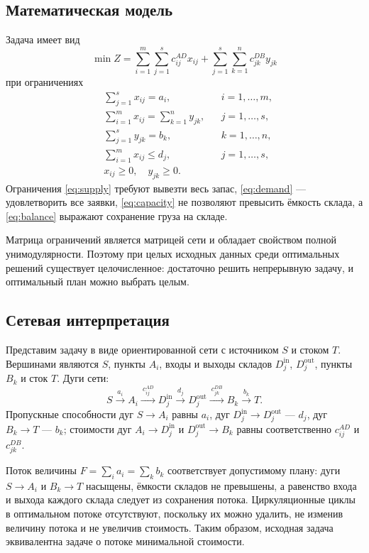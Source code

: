 \subsection*{Математическая модель}

Задача имеет вид
\[
\min Z=\sum_{i=1}^{m}\sum_{j=1}^{s} c^{AD}_{ij}x_{ij}
      +\sum_{j=1}^{s}\sum_{k=1}^{n} c^{DB}_{jk}y_{jk}
\]
при ограничениях
\begin{align}
&\sum_{j=1}^{s} x_{ij}=a_i, && i=1,\ldots,m, \label{eq:supply}\\
&\sum_{i=1}^{m} x_{ij}=\sum_{k=1}^{n} y_{jk}, && j=1,\ldots,s, \label{eq:balance}\\
&\sum_{j=1}^{s} y_{jk}=b_k, && k=1,\ldots,n, \label{eq:demand}\\
&\sum_{i=1}^{m} x_{ij}\le d_j, && j=1,\ldots,s, \label{eq:capacity}\\
&x_{ij}\ge 0,\quad y_{jk}\ge 0. \label{eq:nonneg}
\end{align}
Ограничения \eqref{eq:supply} требуют вывезти весь запас, \eqref{eq:demand}
--- удовлетворить все заявки, \eqref{eq:capacity} не позволяют превысить
ёмкость склада, а \eqref{eq:balance} выражают сохранение груза на складе.

Матрица ограничений является матрицей сети и обладает свойством полной
унимодулярности. Поэтому при целых исходных данных среди оптимальных
решений существует целочисленное: достаточно решить непрерывную задачу,
и оптимальный план можно выбрать целым.

\subsection*{Сетевая интерпретация}

Представим задачу в виде ориентированной сети с источником $S$ и стоком
$T$. Вершинами являются $S$, пункты $A_i$, входы и выходы складов
$D_j^{\mathrm{in}}$, $D_j^{\mathrm{out}}$, пункты $B_k$ и сток $T$.
Дуги сети:
\[
S \xrightarrow{\ a_i\ } A_i
  \xrightarrow{\ c^{AD}_{ij}\ } D_j^{\mathrm{in}}
  \xrightarrow{\ d_j\ } D_j^{\mathrm{out}}
  \xrightarrow{\ c^{DB}_{jk}\ } B_k
  \xrightarrow{\ b_k\ } T .
\]
Пропускные способности дуг $S\to A_i$ равны $a_i$, дуг
$D_j^{\mathrm{in}}\to D_j^{\mathrm{out}}$ --- $d_j$, дуг $B_k\to T$ ---
$b_k$; стоимости дуг $A_i\to D_j^{\mathrm{in}}$ и
$D_j^{\mathrm{out}}\to B_k$ равны соответственно $c^{AD}_{ij}$ и
$c^{DB}_{jk}$.

Поток величины $F=\sum_i a_i=\sum_k b_k$ соответствует допустимому плану:
дуги $S\to A_i$ и $B_k\to T$ насыщены, ёмкости складов не превышены, а
равенство входа и выхода каждого склада следует из сохранения потока.
Циркуляционные циклы в оптимальном потоке отсутствуют, поскольку их можно
удалить, не изменив величину потока и не увеличив стоимость. Таким
образом, исходная задача эквивалентна задаче о потоке минимальной стоимости.


